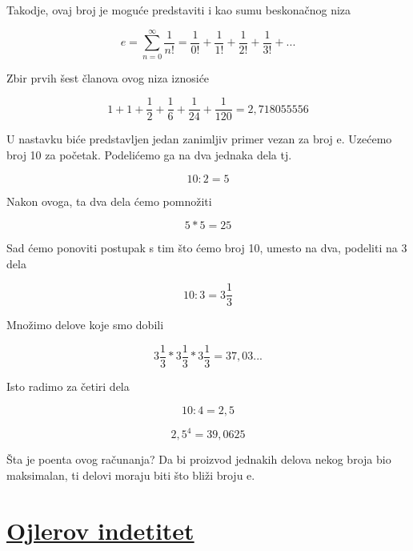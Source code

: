 \documentclass{article}
\begin{document}
	Takodje, ovaj broj je moguće predstaviti i kao sumu beskonačnog niza

 \vspace{10mm}
	\[ e= \sum_{n=0}^{\infty} \frac{1}{n!} = \frac{1}{0!} + \frac{1}{1!} + \frac{1}{2!} + \frac{1}{3!} + ... \]
	\vspace{5mm}
	
	Zbir prvih šest članova ovog niza iznosiće
	
	\[ 1 + 1 + \frac{1}{2} + \frac{1}{6} + \frac{1}{24} + \frac{1}{120} = 2,718055556 \]
	\vspace{5mm}\cite{zavod}
	
	U nastavku biće predstavljen jedan zanimljiv primer vezan za broj e. Uzećemo broj 10 za početak. Podelićemo ga na dva jednaka dela tj.
	
	\[ 10 : 2 = 5 \]
	\vspace{5mm}
	
	Nakon ovoga, ta dva dela ćemo pomnožiti
	
	\[ 5 * 5 = 25 \]
	\vspace{5mm}
	
	Sad ćemo ponoviti postupak s tim što ćemo broj 10, umesto na dva, podeliti na 3 dela
	
	\[ 10 : 3 = 3\frac{1}{3} \]
	\vspace{5mm}
	
	Množimo delove koje smo dobili
	
	\[  3\frac{1}{3} *  3\frac{1}{3} *  3\frac{1}{3} = 37,03... \]
	\vspace{5mm}
	
	Isto radimo za četiri dela
	
	\[ 10 : 4 = 2,5 \]
	
	\[ 2,5^4 = 39,0625\]
	\vspace{5mm}\cite{matematika} 
	
	Šta je poenta ovog računanja? Da bi proizvod jednakih delova nekog broja bio maksimalan, ti delovi moraju biti što bliži broju e.
	\section*{\uline{Ojlerov indetitet}}
\paragraph{}
\end{document}
